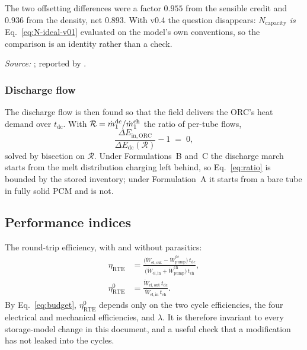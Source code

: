 \noindent The two offsetting differences were a factor $0.955$ from the sensible
credit and $0.936$ from the density, net $0.893$. With v0.4 the question
disappears: $N_{\mathrm{capacity}}$ \emph{is} Eq.~\eqref{eq:N-ideal-v01}
evaluated on the model's own conventions, so the comparison is an identity
rather than a check.

\emph{Source:} ; reported by .

\subsubsection*{Discharge flow}

The discharge flow is then found so that the field delivers the ORC's heat
demand over $t_{\mathrm{dc}}$. With $\mathcal{R}=\dot m^{\mathrm{dc}}_{1}/\dot m^{\mathrm{ch}}_{1}$
the ratio of per-tube flows,
\begin{equation}
  \frac{\Delta E_{\mathrm{in,ORC}}}
       {\Delta E_{\mathrm{dc}}(\mathcal{R})} - 1 \;=\; 0,
  \label{eq:ratio}
\end{equation}
solved by bisection on $\mathcal{R}$. Under Formulations~B and~C the discharge
march starts from the melt distribution charging left behind, so
Eq.~\eqref{eq:ratio} is bounded by the stored inventory; under Formulation~A it
starts from a bare tube in fully solid PCM and is not.

\subsection{Performance indices}
\label{sec:hydraulics:kpi}

The round-trip efficiency, with and without parasitics:
\begin{align}
  \eta_{\mathrm{RTE}}
  &=
  \frac{\bigl(\dot W_{\mathrm{el,out}}
        - \dot W_{\mathrm{pump}}^{\mathrm{dc}}\bigr)\,t_{\mathrm{dc}}}
       {\bigl(\dot W_{\mathrm{el,in}}
        + \dot W_{\mathrm{pump}}^{\mathrm{ch}}\bigr)\,t_{\mathrm{ch}}},
  \label{eq:rte}\\[4pt]
  \eta_{\mathrm{RTE}}^{0}
  &=
  \frac{\dot W_{\mathrm{el,out}}\,t_{\mathrm{dc}}}
       {\dot W_{\mathrm{el,in}}\,t_{\mathrm{ch}}} .
  \label{eq:rte0}
\end{align}
By Eq.~\eqref{eq:budget}, $\eta_{\mathrm{RTE}}^{0}$ depends only on the two cycle
efficiencies, the four electrical and mechanical efficiencies, and $\lambda$. It
is therefore invariant to every storage-model change in this document, and a
useful check that a modification has not leaked into the cycles.

